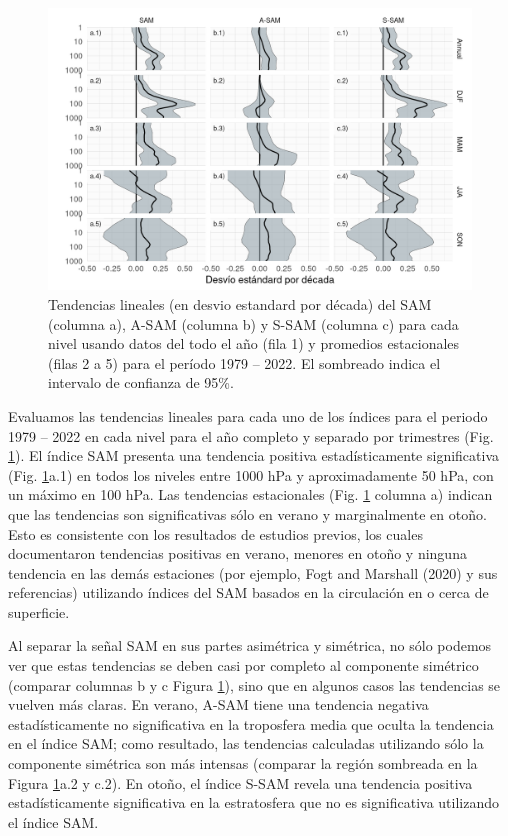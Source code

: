 \documentclass[12pt,oneside]{reedthesis}
\begin{document}
\begin{figure}
\includegraphics{figures/30-sam/trends-1} \caption{Tendencias lineales (en desvio estandard por década) del SAM (columna a), A-SAM (columna b) y S-SAM (columna c) para cada nivel usando datos del todo el año (fila 1) y promedios estacionales (filas 2 a 5) para el período 1979 -- 2022.
El sombreado indica el intervalo de confianza de 95\%.}\label{fig:trends}
\end{figure}


Evaluamos las tendencias lineales para cada uno de los índices para el periodo 1979 -- 2022 en cada nivel para el año completo y separado por trimestres (Fig. \ref{fig:trends}).
El índice SAM presenta una tendencia positiva estadísticamente significativa (Fig. \ref{fig:trends}a.1) en todos los niveles entre 1000 hPa y aproximadamente 50 hPa, con un máximo en 100 hPa.
Las tendencias estacionales (Fig. \ref{fig:trends} columna a) indican que las tendencias son significativas sólo en verano y marginalmente en otoño.
Esto es consistente con los resultados de estudios previos, los cuales documentaron tendencias positivas en verano, menores en otoño y ninguna tendencia en las demás estaciones (por ejemplo, Fogt and Marshall (2020) y sus referencias) utilizando índices del SAM basados en la circulación en o cerca de superficie.

Al separar la señal SAM en sus partes asimétrica y simétrica, no sólo podemos ver que estas tendencias se deben casi por completo al componente simétrico (comparar columnas b y c Figura \ref{fig:trends}), sino que en algunos casos las tendencias se vuelven más claras.
En verano, A-SAM tiene una tendencia negativa estadísticamente no significativa en la troposfera media que oculta la tendencia en el índice SAM; como resultado, las tendencias calculadas utilizando sólo la componente simétrica son más intensas (comparar la región sombreada en la Figura \ref{fig:trends}a.2 y c.2).
En otoño, el índice S-SAM revela una tendencia positiva estadísticamente significativa en la estratosfera que no es significativa utilizando el índice SAM.
\end{document}
